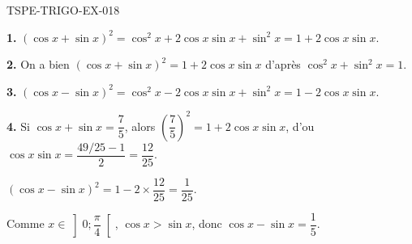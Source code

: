 \begin{corrige}{TSPE-TRIGO-EX-018}

\textbf{1.} $(\cos x + \sin x)^2 = \cos^2 x + 2\cos x\sin x + \sin^2 x = 1 + 2\cos x\sin x$.

\textbf{2.} On a bien $(\cos x + \sin x)^2 = 1 + 2\cos x\sin x$ d'après $\cos^2 x + \sin^2 x = 1$.

\textbf{3.} $(\cos x - \sin x)^2 = \cos^2 x - 2\cos x\sin x + \sin^2 x = 1 - 2\cos x\sin x$.

\textbf{4.} Si $\cos x + \sin x = \dfrac{7}{5}$, alors $\left(\dfrac{7}{5}\right)^2 = 1 + 2\cos x\sin x$, d'ou $\cos x\sin x = \dfrac{49/25 - 1}{2} = \dfrac{12}{25}$.

$(\cos x - \sin x)^2 = 1 - 2 \times \dfrac{12}{25} = \dfrac{1}{25}$.

Comme $x \in \left]0;\dfrac{\pi}{4}\right[$, $\cos x > \sin x$, donc $\cos x - \sin x = \dfrac{1}{5}$.

\end{corrige}

